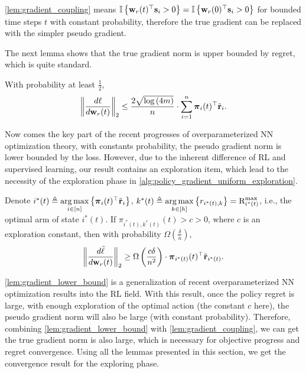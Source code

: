 \cref{lem:gradient_coupling} means ${\mathbb{I}}\left\{ {\mathbf{w}}_r(t)^\top {\mathbf{s}}_i > 0 \right\} = {\mathbb{I}}\left\{ {\mathbf{w}}_r(0)^\top {\mathbf{s}}_i > 0 \right\} $ for bounded time steps $t$ with constant probability, therefore the true gradient can be replaced with the simpler pseudo gradient.

The next lemma shows that the true gradient norm is upper bounded by regret, which is quite standard.

\begin{lem}
\label{lem:gradient_upper_bound}
With probability at least $\frac{1}{2}$,
\begin{equation*}
\begin{split}
	\left\| \frac{d\ell}{d {\mathbf{w}}_r(t)} \right\|_2 \le \frac{2 \sqrt{\log{\left(4m\right)}}}{n} \cdot \sum\limits_{i=1}^{n}{ {\boldsymbol{\pi}}_{i}(t)^\top {\tilde{\mathbf{r}}}_i }.
\end{split}
\end{equation*}
\end{lem}

Now comes the key part of the recent progresses of overparameterized NN optimization theory, with constants probability, the pseudo gradient norm is lower bounded by the loss. However, due to the inherent difference of RL and supervised learning, our result contains an exploration item, which lead to the necessity of the exploration phase in \cref{alg:policy_gradient_uniform_exploration}. 

\begin{lem}
\label{lem:gradient_lower_bound}
	Denote $i^*(t) \triangleq \operatorname*{arg\,max}\limits_{i \in [n]}\left\{{\boldsymbol{\pi}}_i(t)^\top {\tilde{\mathbf{r}}}_i \right\}$, $k^*(t) \triangleq \operatorname*{arg\,max}\limits_{k \in [h]}\left\{ r_{i^*(t),k} \right\} = {\text{R}}_{i^*(t)}^{\max}$, i.e., the optimal arm of state $i^*(t)$. If $\pi_{i^*(t), k^*(t)}(t) > c > 0$, where $c$ is an exploration constant, then with probability $\Omega\left( \frac{\delta}{n} \right)$,
\begin{equation*}
\begin{split}
	\left\| \frac{d\tilde{\ell}}{d {\mathbf{w}}_r(t)} \right\|_2 \ge \Omega\left( \frac{c\delta}{n^2} \right) \cdot {\boldsymbol{\pi}}_{i^*(t)}(t)^\top {\tilde{\mathbf{r}}}_{i^*(t)} .
\end{split}
\end{equation*}
\end{lem}

\cref{lem:gradient_lower_bound} is a generalization of recent overparameterized NN optimization results into the RL field. With this result, once the policy regret is large, with enough exploration of the optimal action (the constant $c$ here), the pseudo gradient norm will also be large (with constant probability). Therefore, combining \cref{lem:gradient_lower_bound} with \cref{lem:gradient_coupling}, we can get the true gradient norm is also large, which is necessary for objective progress and regret convergence. Using all the lemmas presented in this section, we get the convergence result for the exploring phase.

